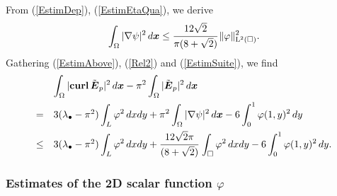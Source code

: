\documentclass[11pt,a4paper]{article}
\newcommand{\dsp}{\displaystyle}
\newcommand{\Om}{\Omega}
\newcommand{\mrm}[1]{\mathrm{#1}}
\newcommand{\bfx}{\boldsymbol{x}}
\newcommand{\mL}{\mrm{L}}
\newcommand{\curlvec}{\boldsymbol{\mrm{curl}}\,}
\newcommand{\GL}{L}
\def\E{\boldsymbol{E}}
\begin{document}
\noindent From (\ref{EstimDep}), (\ref{EstimEtaQua}), we derive 
\begin{equation}\label{EstimSuite}
\int_\Om|\nabla\psi|^2\,d\bfx \le \cfrac{12\sqrt{2}}{\pi(8+\sqrt{2})}\,\|\varphi\|^2_{\mL^2(\square)}.
\end{equation}
Gathering (\ref{EstimAbove}), (\ref{Rel2}) and (\ref{EstimSuite}), we find
\begin{equation}\label{CalculImp}
\begin{array}{ll}
&\dsp\int_{\Om} |\curlvec\tilde{\E}_{p}|^2\,d\bfx-\pi^2\int_{\Om} |\tilde{\E}_{p}|^2\,d\bfx \\[10pt] =&3(\lambda_\bullet-\pi^2)\dsp\int_\GL\varphi^2\,dxdy+\pi^2\int_{\Om} |\nabla\psi|^2\,d\bfx-6\int_0^1\varphi(1,y)^2\,dy\\[10pt]
\le&3(\lambda_\bullet-\pi^2)\dsp\int_\GL\varphi^2\,dxdy+\cfrac{12\sqrt{2}\pi}{(8+\sqrt{2})}\,\dsp\int_{\square}\varphi^2\,dxdy -6\int_0^1\varphi(1,y)^2\,dy.
\end{array}
\end{equation}

\subsubsection*{Estimates of the 2D scalar function $\varphi$}
\end{document}
